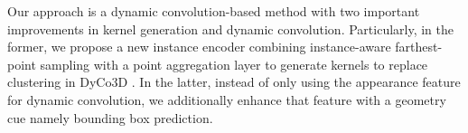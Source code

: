 \documentclass[10pt,twocolumn,letterpaper]{article}
\begin{document}
Our approach is a dynamic convolution-based method with two important improvements in kernel generation and dynamic convolution. Particularly, in the former, we propose a new instance encoder combining instance-aware farthest-point sampling with a point aggregation layer to generate kernels to replace clustering in DyCo3D \cite{he2021dyco3d}. In the latter, instead of only using the appearance feature for dynamic convolution, we additionally enhance that feature with a geometry cue namely bounding box prediction. 









\end{document}
